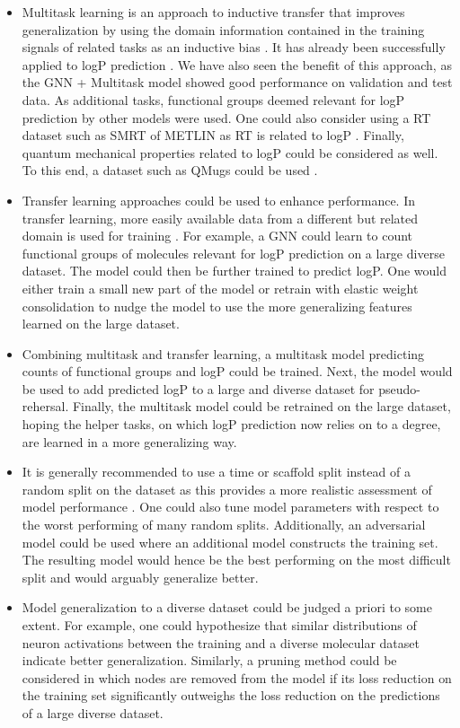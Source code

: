 \documentclass{article}
\begin{document}
\begin{itemize}
\item Multitask learning is an approach to inductive transfer that improves generalization by using the domain information contained in the training signals of related tasks as an inductive bias \cite{caruana1997multitask}. It has already been successfully applied to logP prediction \cite{lenselink2021multitask}. We have also seen the benefit of this approach, as the GNN + Multitask model showed good performance on validation and test data. As additional tasks, functional groups deemed relevant for logP prediction by other models were used. One could also consider using a RT dataset such as SMRT of METLIN as RT is related to logP \cite{domingo2019metlin}. Finally, quantum mechanical properties related to logP could be considered as well. To this end, a dataset such as QMugs could be used \cite{isert2022qmugs}.
\item Transfer learning approaches could be used to enhance performance. In transfer learning, more easily available data from a different but related domain is used for training \cite{weiss2016survey}. For example, a GNN could learn to count functional groups of molecules relevant for logP prediction on a large diverse dataset. The model could then be further trained to predict logP. One would either train a small new part of the model or retrain with elastic weight consolidation to nudge the model to use the more generalizing features learned on the large dataset.
\item Combining multitask and transfer learning, a multitask model predicting counts of functional groups and logP could be trained. Next, the model would be used to add predicted logP to a large and diverse dataset for pseudo-rehersal. Finally, the multitask model could be retrained on the large dataset, hoping the helper tasks, on which logP prediction now relies on to a degree, are learned in a more generalizing way.
\item It is generally recommended to use a time or scaffold split instead of a random split on the dataset as this provides a more realistic assessment of model performance \cite{lenselink2021multitask}. One could also tune model parameters with respect to the worst performing of many random splits. Additionally, an adversarial model could be used where an additional model constructs the training set. The resulting model would hence be the best performing on the most difficult split and would arguably generalize better.
\item Model generalization to a diverse dataset could be judged a priori to some extent. For example, one could hypothesize that similar distributions of neuron activations between the training and a diverse molecular dataset indicate better generalization. Similarly, a pruning method could be considered in which nodes are removed from the model if its loss reduction on the training set significantly outweighs the loss reduction on the predictions of a large diverse dataset.

\end{itemize}
\end{document}
